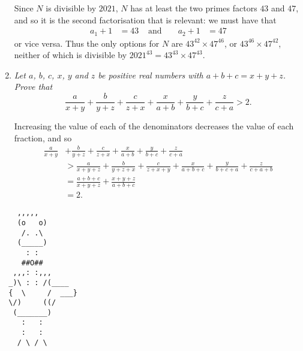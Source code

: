 \documentclass{article}
\begin{document}
\begin{enumerate}[1.]
  Since $N$ is divisible by $2021$, $N$ has at least the two primes factors $43$ and $47$, and so it is the second factorisation that is relevant: we must have that
  \begin{align*}
    a_1 + 1 & = 43 & \text{ and } && a_2 + 1 & = 47
  \end{align*}
  or vice versa. Thus the only options for $N$ are $43^{42} \times 47^{46}$, or $43^{46} \times 47^{42}$, neither of which is divisible by $2021^{43} = 43^{43} \times 47^{43}$.
    
  
  \item %
  {\itshape Let $a$, $b$, $c$, $x$, $y$ and $z$ be positive real numbers with $a + b + c = x + y + z$.
  Prove that 
  \[ \frac{a}{x + y} + \frac{b}{y + z} + \frac{c}{z + x} + \frac{x}{a + b} + \frac{y}{b + c} + \frac{z}{c + a} > 2. \]}
  
  Increasing the value of each of the denominators decreases the value of each fraction, and so
  \begin{align*}
    \frac{a}{x + y} & + \frac{b}{y + z} + \frac{c}{z + x} + \frac{x}{a + b} + \frac{y}{b + c} + \frac{z}{c + a} \\
    & > \frac{a}{x + y + z} + \frac{b}{y + z + x} + \frac{c}{z + x + y} + \frac{x}{a + b + c} + \frac{y}{b + c + a} + \frac{z}{c + a + b} \\
    & = \frac{a + b + c}{x + y + z} + \frac{x + y + z}{a + b + c} \\
    & = 2.
  \end{align*}
  
  \end{enumerate}
  
  \vfill
  \centering
  \begin{BVerbatim}
    ,,,,,
    (o   o)
     /. .\ 
    (_____)
      : :
     ##O##
   ,,,: :,,,
  _)\ : : /(____
  {  \     /  ___}
  \/)     ((/
   (_______)
     :   :
     :   :
    / \ / \
  \end{BVerbatim}
  
\end{document}

